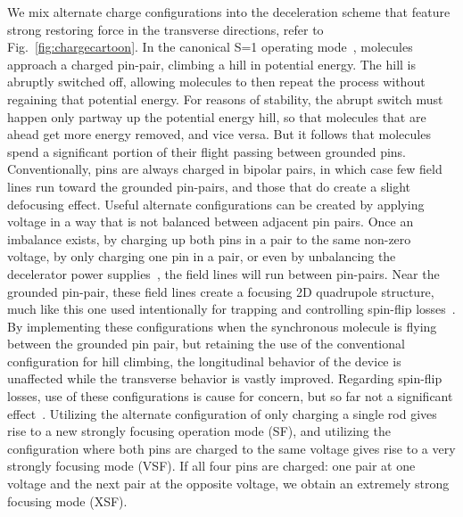 \documentclass[%
 reprint,
 amsmath,amssymb,
 aps,
prl,
]{revtex4-1}
\begin{document}
We mix alternate charge configurations into the deceleration scheme that feature strong restoring force in the transverse directions, refer to Fig.~\ref{fig:chargecartoon}.
In the canonical S=1 operating mode~\cite{VanDeMeerakker2012}, molecules approach a charged pin-pair, climbing a hill in potential energy. 
The hill is abruptly switched off, allowing molecules to then repeat the process without regaining that potential energy.
For reasons of stability, the abrupt switch must happen only partway up the potential energy hill, so that molecules that are ahead get more energy removed, and vice versa. 
But it follows that molecules spend a significant portion of their flight passing between grounded pins.
Conventionally, pins are always charged in bipolar pairs, in which case few field lines run toward the grounded pin-pairs, and those that do create a slight defocusing effect. 
Useful alternate configurations can be created by applying voltage in a way that is not balanced between adjacent pin pairs. 
Once an imbalance exists, by charging up both pins in a pair to the same non-zero voltage, by only charging one pin in a pair, or even by unbalancing the decelerator power supplies~\cite{Hoekstra2018}, the field lines will run between pin-pairs. 
Near the grounded pin-pair, these field lines create a focusing 2D quadrupole structure, much like this one used intentionally for trapping and controlling spin-flip losses~\cite{Reens2017}. 
By implementing these configurations when the synchronous molecule is flying between the grounded pin pair, but retaining the use of the conventional configuration for hill climbing, the longitudinal behavior of the device is unaffected while the transverse behavior is vastly improved.
Regarding spin-flip losses, use of these configurations is cause for concern, but so far not a significant effect~\cite{ssm}.
Utilizing the alternate configuration of only charging a single rod gives rise to a new strongly focusing operation mode (SF), and utilizing the configuration where both pins are charged to the same voltage gives rise to a very strongly focusing mode (VSF). 
If all four pins are charged: one pair at one voltage and the next pair at the opposite voltage, we obtain an extremely strong focusing mode (XSF).
\end{document}
